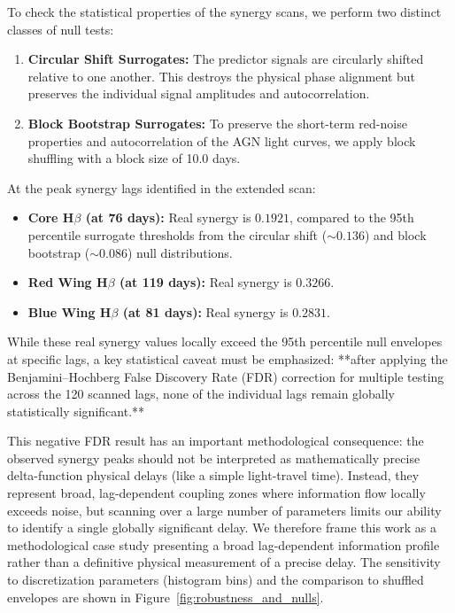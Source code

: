\documentclass[12pt, a4paper]{article}
\begin{document}
To check the statistical properties of the synergy scans, we perform two distinct classes of null tests:
\begin{enumerate}
\item \textbf{Circular Shift Surrogates:} The predictor signals are circularly shifted relative to one another. This destroys the physical phase alignment but preserves the individual signal amplitudes and autocorrelation.
\item \textbf{Block Bootstrap Surrogates:} To preserve the short-term red-noise properties and autocorrelation of the AGN light curves, we apply block shuffling with a block size of 10.0 days.
\end{enumerate}

At the peak synergy lags identified in the extended scan:
\begin{itemize}
\item \textbf{Core H\(\beta\) (at 76 days):} Real synergy is $0.1921$, compared to the 95th percentile surrogate thresholds from the circular shift ($\sim 0.136$) and block bootstrap ($\sim 0.086$) null distributions.
\item \textbf{Red Wing H\(\beta\) (at 119 days):} Real synergy is $0.3266$.
\item \textbf{Blue Wing H\(\beta\) (at 81 days):} Real synergy is $0.2831$.
\end{itemize}

While these real synergy values locally exceed the 95th percentile null envelopes at specific lags, a key statistical caveat must be emphasized: **after applying the Benjamini–Hochberg False Discovery Rate (FDR) correction for multiple testing across the 120 scanned lags, none of the individual lags remain globally statistically significant.** 

This negative FDR result has an important methodological consequence: the observed synergy peaks should not be interpreted as mathematically precise delta-function physical delays (like a simple light-travel time). Instead, they represent broad, lag-dependent coupling zones where information flow locally exceeds noise, but scanning over a large number of parameters limits our ability to identify a single globally significant delay. We therefore frame this work as a methodological case study presenting a broad lag-dependent information profile rather than a definitive physical measurement of a precise delay. The sensitivity to discretization parameters (histogram bins) and the comparison to shuffled envelopes are shown in Figure~\ref{fig:robustness_and_nulls}.
\end{document}
